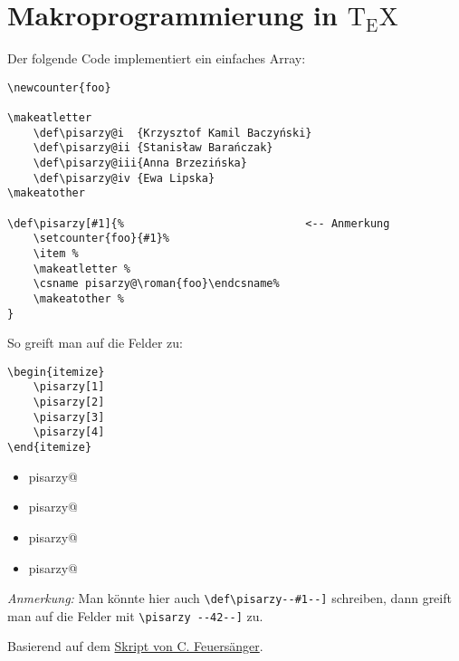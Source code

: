		\section{Makroprogrammierung in ${\mathrm{T\!_{\displaystyle E}\!X}}$}
			Der folgende Code implementiert ein einfaches Array:
			\begin{verbatim}
\newcounter{foo}

\makeatletter
    \def\pisarzy@i 	{Krzysztof Kamil Baczyński}
    \def\pisarzy@ii	{Stanisław Barańczak}
    \def\pisarzy@iii{Anna Brzezińska}
    \def\pisarzy@iv {Ewa Lipska}
\makeatother

\def\pisarzy[#1]{%                            <-- Anmerkung
    \setcounter{foo}{#1}%
    \item %
    \makeatletter %
    \csname pisarzy@\roman{foo}\endcsname%
    \makeatother %
}
			\end{verbatim}

			\makeatletter
				\def\pisarzy@i 	{Krzysztof Kamil Baczyński}
				\def\pisarzy@ii	{Stanisław Barańczak}
				\def\pisarzy@iii{Anna Brzezińska}
				\def\pisarzy@iv {Ewa Lipska}
			\makeatother

			\def\pisarzy[#1]{%
				\setcounter{foo}{#1}%
				\item %
				\makeatletter %
				\csname pisarzy@\roman{foo}\endcsname%
				\makeatother %
			}

			\newpage
			So greift man auf die Felder zu:

			\begin{verbatim}
\begin{itemize}
    \pisarzy[1]
    \pisarzy[2]
    \pisarzy[3]
    \pisarzy[4]
\end{itemize}
			\end{verbatim}

			\begin{itemize}
				\pisarzy[1]
				\pisarzy[2]
				\pisarzy[3]
				\pisarzy[4]
			\end{itemize}

			\emph{Anmerkung:} Man könnte hier auch \verb|\def\pisarzy--#1--]| schreiben, dann greift man auf die Felder mit \verb|\pisarzy --42--]| zu.

			Basierend auf dem \href{http://pgfplots.sourceforge.net/TeX-programming-notes.pdf}{Skript von C. Feuersänger}.

